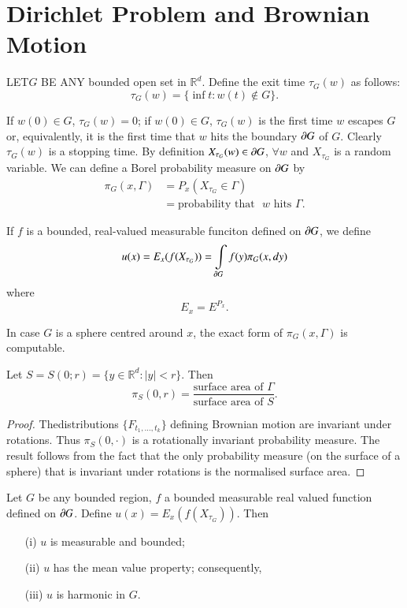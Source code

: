 \chapter{Dirichlet Problem and Brownian Motion}\label{chap10}

LET\pageoriginale $G$ BE ANY bounded open set in
$\mathbb{R}^{d}$. Define the exit time $\tau_{G}(w)$ as follows:
$$
\tau_{G}(w)=\{\inf t:w(t)\not\in G\}.
$$

If $w(0)\in G$, $\tau_{G}(w)=0$; if $w(0)\in G$, $\tau_{G}(w)$ is the
first time $w$ escapes $G$ or, equivalently, it is the first time that
$w$ hits the boundary $\partial G$ of $G$. Clearly $\tau_{G}(w)$ is a
stopping time. By definition $X_{\tau_{G}}(w)\in \partial G$, $\forall w$
and $X_{\tau_{G}}$ is a random variable. We can define a Borel
probability measure on $\partial G$ by
\begin{align*}
\pi_{G}(x,\Gamma) &= P_{x}(X_{\tau_{G}}\in\Gamma)\\
&= \text{probability that~ $w$ hits $\Gamma$.}
\end{align*}

If $f$ is a bounded, real-valued measurable funciton defined on $\partial
G$, we define
$$
u(x)=E_{x}(f(X_{\tau_{G}}))=\int\limits_{\partial G}f(y)\pi_{G}(x,dy)
$$
where 
$$
E_{x}=E^{P_{x}}.
$$

In case $G$ is a sphere centred around $x$, the exact form of
$\pi_{G}(x,\Gamma)$ is computable.

\begin{theorem*}
Let $S=S(0;r)=\{y\in \mathbb{R}^{d}:|y|<r\}$. Then
$$
\pi_{S}(0,r)=\frac{\text{surface area of~} \Gamma}{\text{surface area
    of~} S}.
$$
\end{theorem*}

\begin{proof}
The\pageoriginale distributions $\{F_{t_{1},\ldots,t_{k}}\}$ defining Brownian
motion are invariant under rotations. Thus $\pi_{S}(0,\cdot)$ is a
rotationally invariant probability measure. The result follows from
the fact that the only probability measure (on the surface of a
sphere) that is invariant under rotations is the normalised surface area.
\end{proof}

\begin{theorem*}
Let $G$ be any bounded region, $f$ a bounded measurable real valued
function defined on $\partial G$. Define $u(x)=E_{x}(f(X_{\tau_{G}}))$. Then
\begin{itemize}
\item[\rm(i)] $u$ is measurable and bounded;

\item[\rm(ii)] $u$ has the mean value property; consequently,

\item[\rm(iii)] $u$ is harmonic in $G$.
\end{itemize}
\end{theorem*}

